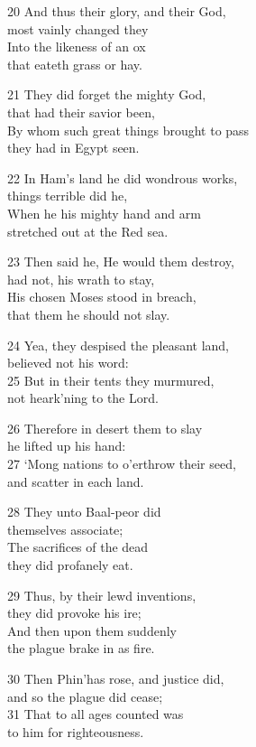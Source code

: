 20 And thus their glory, and their God,\\
most vainly changed they\\
Into the likeness of an ox\\
that eateth grass or hay.

21 They did forget the mighty God,\\
that had their savior been,\\
By whom such great things brought to pass\\
they had in Egypt seen.

22 In Ham’s land he did wondrous works,\\
things terrible did he,\\
When he his mighty hand and arm\\
stretched out at the Red sea.

23 Then said he, He would them destroy,\\
had not, his wrath to stay,\\
His chosen Moses stood in breach,\\
that them he should not slay.

24 Yea, they despised the pleasant land,\\
believed not his word:\\
25 But in their tents they murmured,\\
not heark’ning to the Lord.

26 Therefore in desert them to slay\\
he lifted up his hand:\\
27 ‘Mong nations to o’erthrow their seed,\\
and scatter in each land.

28 They unto Baal-peor did\\
themselves associate;\\
The sacrifices of the dead\\
they did profanely eat.

29 Thus, by their lewd inventions,\\
they did provoke his ire;\\
And then upon them suddenly\\
the plague brake in as fire.

30 Then Phin’has rose, and justice did,\\
and so the plague did cease;\\
31 That to all ages counted was\\
to him for righteousness.

